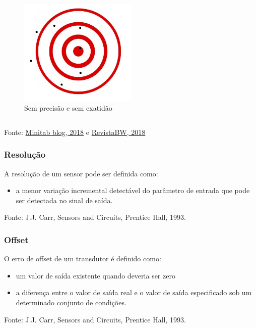 \documentclass[t]{beamer}
\begin{document}
\begin{frame}
\begin{columns}
\begin{column}{0.5\textwidth}
\begin{figure}
			\includegraphics[width=0.5\textwidth]{semprecisaosemexatidao}
			\caption{Sem precisão e sem exatidão}
		\end{figure}
	\end{column}
\end{columns}
{\scriptsize Fonte: \href{http://blog.minitab.com/blog/real-world-quality-improvement/accuracy-vs-precision-whats-the-difference}{Minitab blog, 2018} e \href{http://www.revistabw.com.br/revistabw/probabilidade-e-estatistica-acuracia-precisao-e-exatidao/}{RevistaBW, 2018}}
\end{frame}

\begin{frame}
	\frametitle{Resolução}
	A resolução de um sensor pode ser definida como:
	\begin{itemize}
		\item a menor variação incremental detectável do parâmetro de entrada que pode ser detectada no sinal de saída.
	\end{itemize}
	
	{\scriptsize Fonte: J.J. Carr, Sensors and Circuits, Prentice Hall, 1993.}
\end{frame}

\begin{frame}
		\frametitle{Offset}
		O erro de offset de um transdutor é definido como:
		\begin{itemize}
			\item um valor de saída existente quando deveria ser zero
			\item a diferença entre o valor de saída real e o valor de saída especificado sob um determinado conjunto de condições.
		\end{itemize}  	
		{\scriptsize Fonte: J.J. Carr, Sensors and Circuits, Prentice Hall, 1993.}
\end{frame}
\end{document}
